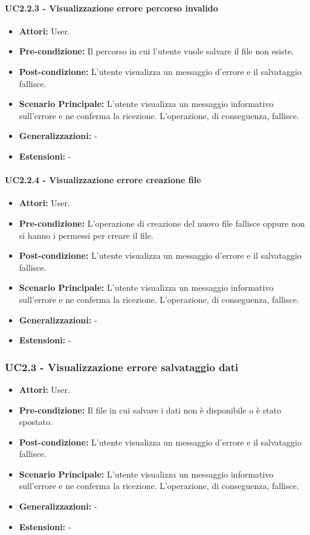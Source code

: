 \paragraph{UC2.2.3 - Visualizzazione errore percorso invalido}
\begin{itemize}
    \item \textbf{Attori:} User.
    \item \textbf{Pre-condizione:} Il percorso in cui l'utente vuole salvare il file non esiste.
    \item \textbf{Post-condizione:} L'utente visualizza un messaggio d'errore e il salvataggio fallisce.
    \item \textbf{Scenario Principale:} L'utente visualizza un messaggio informativo sull'errore e ne conferma la ricezione. L'operazione, di conseguenza, fallisce.
    \item \textbf{Generalizzazioni:} -
    \item \textbf{Estensioni:} -
\end{itemize}


\paragraph{UC2.2.4 - Visualizzazione errore creazione file}
\begin{itemize}
    \item \textbf{Attori:} User.
    \item \textbf{Pre-condizione:} L'operazione di creazione del nuovo file fallisce oppure non si hanno i permessi per creare il file.
    \item \textbf{Post-condizione:} L'utente visualizza un messaggio d'errore e il salvataggio fallisce.
    \item \textbf{Scenario Principale:} L'utente visualizza un messaggio informativo sull'errore e ne conferma la ricezione. L'operazione, di conseguenza, fallisce.
    \item \textbf{Generalizzazioni:} -
    \item \textbf{Estensioni:} -
\end{itemize}


\subsubsection{UC2.3 - Visualizzazione errore salvataggio dati}
\begin{itemize}
    \item \textbf{Attori:} User.
    \item \textbf{Pre-condizione:}  Il file in cui salvare i dati non è disponibile o è stato spostato. 
    \item \textbf{Post-condizione:} L'utente visualizza un messaggio d'errore e il salvataggio fallisce.
    \item \textbf{Scenario Principale:}  L'utente visualizza un messaggio informativo sull'errore e ne conferma la ricezione. L'operazione, di conseguenza, fallisce.
    \item \textbf{Generalizzazioni:} -
    \item \textbf{Estensioni:} -
\end{itemize}